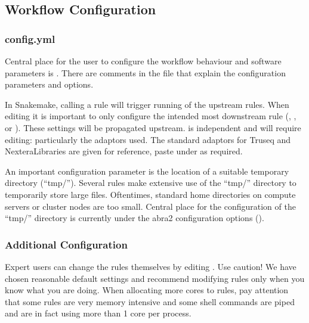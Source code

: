 \documentclass[letterpaper,10pt,english]{sphinxhowto}
\begin{document}
\subsection{Workflow Configuration}
\label{\detokenize{index:workflow-configuration}}

\subsubsection{config.yml}
\label{\detokenize{index:config-yml}}
Central place for the user to configure the workflow behaviour and software parameters is . There are comments in the file that explain the configuration parameters and options.

In Snakemake, calling a rule will trigger running of the upstream rules. When editing  it is important to only configure the intended most downstream rule (, , or ). These settings will be propagated upstream.  is independent and will require editing: particularly the  adaptors used. The standard adaptors for Truseq\sphinxhyphen{} and Nextera\sphinxhyphen{}Libraries are given for reference, paste under  as required.

An important configuration parameter is the location of a suitable temporary directory (“tmp/”). Several rules make extensive use of the “tmp/” directory to temporarily store large files. Oftentimes, standard home directories on compute servers or cluster nodes are too small. Central place for the configuration of the “tmp/” directory is currently under the abra2 configuration options ().


\subsubsection{Additional Configuration}
\label{\detokenize{index:additional-configuration}}
Expert users can change the rules themselves by editing . Use caution! We have chosen reasonable default settings and recommend modifying rules only when you know what you are doing. When allocating more cores to rules, pay attention that some rules are very memory intensive and some shell commands are piped and are in fact using more than 1 core per process.
\end{document}
